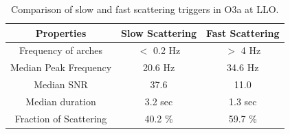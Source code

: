\documentclass[12pt]{iopart}
\begin{document}
\begin{table}[h]
    \centering
    \begin{tabular}{c|c|c}
    \hline
      \textbf{Properties}   &  \textbf{Slow Scattering} & 
      \textbf{Fast Scattering}\\
      \hline
       Frequency of arches  & $<$ 0.2 Hz & $>$ 4 Hz \\
      \hline
      Median Peak Frequency & 20.6 Hz & 34.6 Hz \\
      \hline
      Median SNR & 37.6 & 11.0 \\
      \hline
      Median duration & 3.2 sec & 1.3 sec \\
      \hline
      Fraction of Scattering & 40.2 \% & 59.7 \% \\
       
    \hline
    \end{tabular}
    \caption{Comparison of slow and fast scattering triggers in O3a at LLO.}
    \label{tab:fastslowtab}
\end{table}{}
\end{document}
